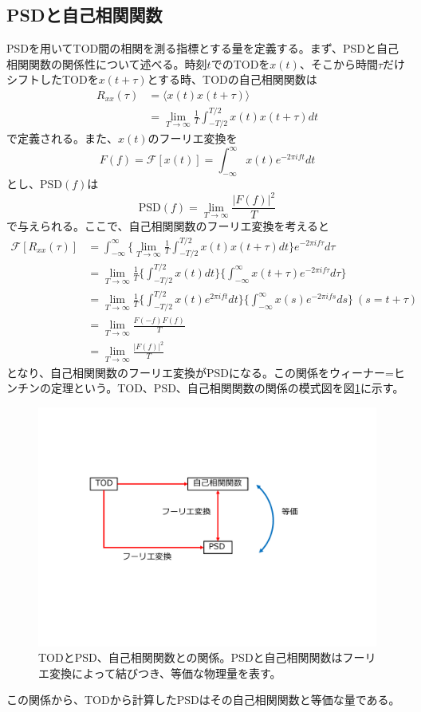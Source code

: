 \subsection{PSDと自己相関関数}
\label{psd_correlation}
PSDを用いてTOD間の相関を測る指標とする量を定義する。まず、PSDと自己相関関数の関係性について述べる。時刻$t$でのTODを$x(t)$、そこから時間$\tau$だけシフトしたTODを$x(t+\tau)$とする時、TODの自己相関関数は
\begin{align}
  R_{xx}(\tau) &= \langle x(t)x(t+\tau) \rangle \\
            &= \lim_{T\to \infty}\frac{1}{T}\int_{-T/2}^{T/2}x(t)x(t+\tau)dt
\end{align}
で定義される。また、$x(t)$のフーリエ変換を
\begin{equation}
  F(f) = \mathcal{F}[x(t)] = \int_{-\infty}^{\infty}x(t)e^{-2\pi ift}dt
\end{equation}
とし、PSD$(f)$は
\begin{equation}
  \mathrm{PSD}(f) = \lim_{T\to \infty}\frac{|F(f)|^{2}}{T}
\end{equation}
で与えられる。ここで、自己相関関数のフーリエ変換を考えると
\begin{align}
  \mathcal{F}[R_{xx}(\tau)] &= \int_{-\infty}^{\infty}\biggl\{\lim_{T\to \infty}\frac{1}{T}\int_{-T/2}^{T/2}x(t)x(t+\tau)dt\biggr\}e^{-2\pi if\tau}d\tau \\
               &= \lim_{T\to \infty}\frac{1}{T}\biggl\{\int_{-T/2}^{T/2}x(t)dt\biggr\}\biggl\{\int_{-\infty}^{\infty}x(t+\tau)e^{-2\pi if\tau}d\tau\biggr\} \\
               &= \lim_{T\to \infty}\frac{1}{T}\biggl\{\int_{-T/2}^{T/2}x(t)e^{2\pi ift}dt\biggr\}\biggl\{\int_{-\infty}^{\infty}x(s)e^{-2\pi ifs}ds\biggr\}~(s=t+\tau)\\
               &= \lim_{T\to \infty}\frac{F(-f)F(f)}{T} \\
               &= \lim_{T\to \infty}\frac{|F(f)|^{2}}{T}
\end{align}
となり、自己相関関数のフーリエ変換がPSDになる。この関係をウィーナー=ヒンチンの定理という。TOD、PSD、自己相関関数の関係の模式図を図\ref{psd_and_selfcor}に示す。
\begin{figure}[htbp]
  \centering
  \includegraphics[width=0.7\columnwidth]{5_alignment/figs/psd_and_selfcor.pdf}
  \caption{TODとPSD、自己相関関数との関係。PSDと自己相関関数はフーリエ変換によって結びつき、等価な物理量を表す。}
  \label{psd_and_selfcor}
\end{figure}
この関係から、TODから計算したPSDはその自己相関関数と等価な量である。

